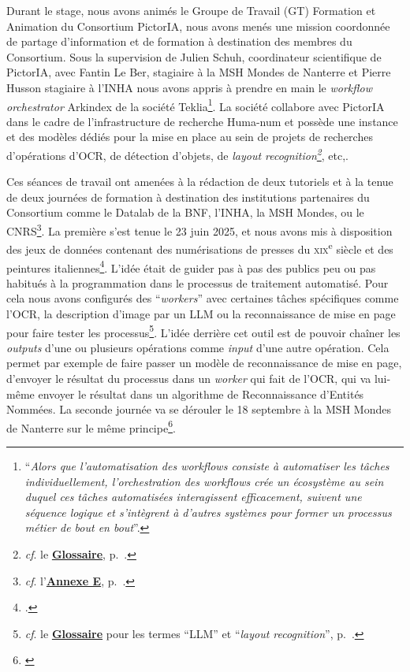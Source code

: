 Durant le stage, nous avons animés le Groupe de Travail (GT) Formation et Animation du Consortium PictorIA, nous avons menés une mission coordonnée de partage d'information et de formation à destination des membres du Consortium. Sous la supervision de Julien Schuh, coordinateur scientifique de PictorIA, avec Fantin Le Ber, stagiaire à la MSH Mondes de Nanterre et Pierre Husson stagiaire à l'INHA nous avons appris à prendre en main le \textit{workflow orchestrator} Arkindex de la société Teklia\footnote{\cite{noauthor_quest-ce_2025}\enquote{\textit{Alors que l’automatisation des workflows consiste à automatiser les tâches individuellement, l’orchestration des workflows crée un écosystème au sein duquel ces tâches automatisées interagissent efficacement, suivent une séquence logique et s’intègrent à d’autres systèmes pour former un processus métier de bout en bout}}.}. La société collabore avec PictorIA dans le cadre de l'infrastructure de recherche Huma-num et possède une instance et des modèles dédiés pour la mise en place au sein de projets de recherches d'opérations d'OCR, de détection d'objets, de \textit{layout recognition\footnote{\textit{cf}. le \textbf{\hyperref[sec:Glossaire]{Glossaire}}, p.~\pageref{sec:Glossaire}.
}}, etc,. 

Ces séances de travail ont amenées à la rédaction de deux tutoriels et à la tenue de deux journées de formation à destination des institutions partenaires du Consortium comme le Datalab de la BNF, l'INHA, la MSH Mondes, ou le CNRS\footnote{\textit{cf}. l'\textbf{\hyperref[sec:Formations]{Annexe E}}, p.~\pageref{sec:Formations}.}. La première s'est tenue le 23 juin 2025, et nous avons mis à disposition des jeux de données contenant des numérisations de presses du \textsc{xix}\textsuperscript{e} siècle et des peintures italiennes\footnote{\cite{le_ber_tutoriel_2025-1}.}. L'idée était de guider pas à pas des publics peu ou pas habitués à la programmation dans le processus de traitement automatisé. Pour cela nous avons configurés des \enquote{\textit{workers}} avec certaines tâches spécifiques comme l'OCR, la description d'image par un LLM ou la reconnaissance de mise en page pour faire tester les processus\footnote{\textit{cf}. le \textbf{\hyperref[sec:Glossaire]{Glossaire}} pour les termes \enquote{LLM} et \enquote{\textit{layout recognition}}, p.~\pageref{sec:Glossaire}.}. L'idée derrière cet outil est de pouvoir chaîner les \textit{outputs} d'une ou plusieurs opérations comme \textit{input} d'une autre opération. Cela permet par exemple de faire passer un modèle de reconnaissance de mise en page, d'envoyer le résultat du processus dans un \textit{worker} qui fait de l'OCR, qui va lui-même envoyer le résultat dans un algorithme de Reconnaissance d'Entités Nommées. La seconde journée va se dérouler le 18 septembre à la MSH Mondes de Nanterre sur le même principe\footnote{\cite{schuh_seminaire-atelier_2025}}.


